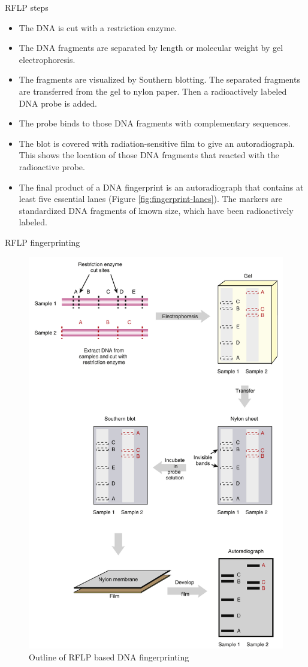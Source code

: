 \documentclass[
  ignorenonframetext,
  aspectratio=169]{beamer}
\providecommand{\tightlist}{%
  \setlength{\itemsep}{0pt}\setlength{\parskip}{0pt}}
\begin{document}
\begin{frame}{RFLP steps}
\protect\hypertarget{rflp-steps}{}
\begin{itemize}
\tightlist
\item
  The DNA is cut with a restriction enzyme.
\item
  The DNA fragments are separated by length or molecular weight by gel
  electrophoresis.
\item
  The fragments are visualized by Southern blotting. The separated
  fragments are transferred from the gel to nylon paper. Then a
  radioactively labeled DNA probe is added.
\item
  The probe binds to those DNA fragments with complementary sequences.
\item
  The blot is covered with radiation-sensitive film to give an
  autoradiograph. This shows the location of those DNA fragments that
  reacted with the radioactive probe.
\item
  The final product of a DNA fingerprint is an autoradiograph that
  contains at least five essential lanes (Figure
  \ref{fig:fingerprint-lanes}). The markers are standardized DNA
  fragments of known size, which have been radioactively labeled.
\end{itemize}
\end{frame}

\begin{frame}{RFLP fingerprinting}
\protect\hypertarget{rflp-fingerprinting}{}
\begin{figure}
\includegraphics[width=0.32\linewidth]{../images/rflp_fingerprinting} \caption{Outline of RFLP based DNA fingerprinting}\label{fig:rflp-fingerprinting}
\end{figure}
\end{frame}
\end{document}
